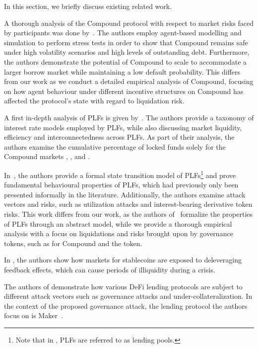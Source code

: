 In this section, we briefly discuss existing related work.

A thorough analysis of the Compound protocol with respect to market risks faced by participants was done by~\cite{kao2020}.
The authors employ agent-based modelling and simulation to perform stress tests in order to show that Compound remains safe under high volatility scenarios and high levels of outstanding debt.
Furthermore, the authors demonstrate the potential of Compound to scale to accommodate a larger borrow market while maintaining a low default probability.
This differs from our work as we conduct a detailed empirical analysis of Compound, focusing on how agent behaviour under different incentive structures on Compound has affected the protocol's state with regard to liquidation risk.  

A first in-depth analysis of PLFs is given by~\cite{10.1145/3419614.3423254}.
The authors provide a taxonomy of interest rate models employed by PLFs, while also discussing market liquidity, efficiency and interconnectedness across PLFs.
As part of their analysis, the authors examine the cumulative percentage of locked funds solely for the Compound markets , , and .

In~\cite{bartoletti2020sok}, the authors provide a formal state transition model of PLFs\footnote{Note that in \cite{bartoletti2020sok}, PLFs are referred to as lending pools.} and prove fundamental behavioural properties of PLFs, which had previously only been presented informally in the literature.
Additionally, the authors examine attack vectors and risks, such as utilization attacks and interest-bearing derivative token risks. 
This work differs from our work, as the authors of~\cite{bartoletti2020sok} formalize the properties of PLFs through an abstract model, while we provide a thorough empirical analysis with a focus on liquidations and risks brought upon by governance tokens, such as for Compound and the  token.

In \cite{klages2019stability}, the authors show how markets for stablecoins are exposed to deleveraging feedback effects, which can cause periods of illiquidity during a crisis.

The authors of \cite{gudgeon2020decentralized} demonstrate how various DeFi lending protocols are subject to different attack vectors such as governance attacks and under-collateralization.
In the context of the proposed governance attack, the lending protocol the authors focus on is Maker~\cite{whitepaper:maker}.

